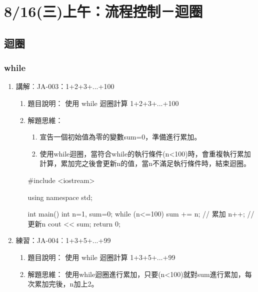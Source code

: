 
\section{8/16(三)上午：流程控制－迴圈}

\subsection{迴圈}
\subsubsection {while}
\begin{enumerate}
	\item 講解︰JA-003：1+2+3+...+100
		\begin{enumerate}
			\item 題目說明：
			\subitem 使用 while 迴圈計算 1+2+3+...+100
			
			\item 解題思維：
			\begin{enumerate}
				\item 宣告一個初始值為零的變數sum=0，準備進行累加。
				\item 使用while迴圈，當符合while的執行條件(n<100)時，會重複執行累加計算，累加完之後會更新n的值，當n不滿足執行條件時，結束迴圈。
				
			\end{enumerate}
				\begin{cppcode}
				#include <iostream>
				
				using namespace std;
				
				int main()
				{
					int n=1, sum=0;
					while (n<=100) {
						sum += n; // 累加
						n++; // 更新n
					}
					cout << sum;
					return 0;
				}
				
			\end{cppcode}
		\end{enumerate}
		
	\item 練習：JA-004︰1+3+5+...+99
		\begin{enumerate}
			\item 題目說明：
			\subitem 使用 while 迴圈計算 1+3+5+...+99
			
			\item 解題思維：
			\subitem 使用while迴圈進行累加，只要(n<100)就對sum進行累加，每次累加完後，n加上2。

		\end{enumerate}
	
\end{enumerate}


